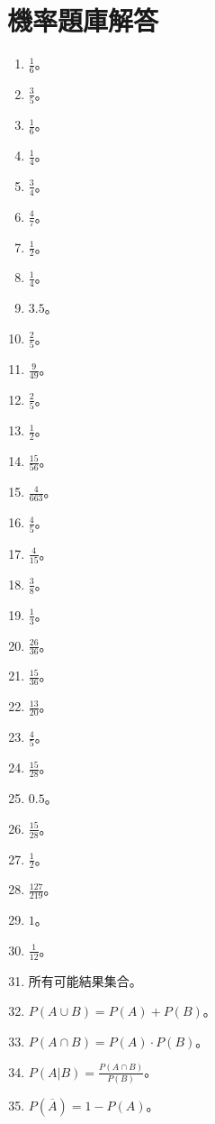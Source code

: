 \section{機率題庫解答}
\begin{enumerate}[label=\arabic*.]
    \item $\frac{1}{6}$。
    \item $\frac{3}{5}$。
    \item $\frac{1}{6}$。
    \item $\frac{1}{4}$。
    \item $\frac{3}{4}$。
    \item $\frac{4}{7}$。
    \item $\frac{1}{2}$。
    \item $\frac{1}{4}$。
    \item $3.5$。
    \item $\frac{2}{5}$。
    \item $\frac{9}{49}$。
    \item $\frac{2}{5}$。
    \item $\frac{1}{2}$。
    \item $\frac{15}{56}$。
    \item $\frac{4}{663}$。
    \item $\frac{4}{5}$。
    \item $\frac{4}{15}$。
    \item $\frac{3}{8}$。
    \item $\frac{1}{3}$。
    \item $\frac{26}{36}$。
    \item $\frac{15}{36}$。
    \item $\frac{13}{20}$。
    \item $\frac{4}{5}$。
    \item $\frac{15}{28}$。
    \item $0.5$。
    \item $\frac{15}{28}$。
    \item $\frac{1}{2}$。
    \item $\frac{127}{219}$。
    \item $1$。
    \item $\frac{1}{12}$。
    \item 所有可能結果集合。
    \item $P(A \cup B) = P(A) + P(B)$。
    \item $P(A \cap B) = P(A) \cdot P(B)$。
    \item $P(A|B) = \frac{P(A \cap B)}{P(B)}$。
    \item $P(\overline{A}) = 1 - P(A)$。

\end{enumerate}
